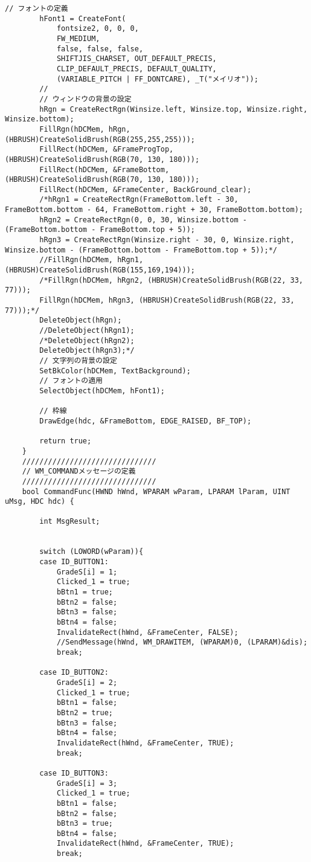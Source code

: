 \begin{lstlisting}[caption=main.cpp]
		// フォントの定義
		hFont1 = CreateFont(
			fontsize2, 0, 0, 0,
			FW_MEDIUM,
			false, false, false,
			SHIFTJIS_CHARSET, OUT_DEFAULT_PRECIS,
			CLIP_DEFAULT_PRECIS, DEFAULT_QUALITY,
			(VARIABLE_PITCH | FF_DONTCARE), _T("メイリオ"));
		//
		// ウィンドウの背景の設定
		hRgn = CreateRectRgn(Winsize.left, Winsize.top, Winsize.right, Winsize.bottom);
		FillRgn(hDCMem, hRgn, (HBRUSH)CreateSolidBrush(RGB(255,255,255)));
		FillRect(hDCMem, &FrameProgTop, (HBRUSH)CreateSolidBrush(RGB(70, 130, 180)));
		FillRect(hDCMem, &FrameBottom, (HBRUSH)CreateSolidBrush(RGB(70, 130, 180)));
		FillRect(hDCMem, &FrameCenter, BackGround_clear);
		/*hRgn1 = CreateRectRgn(FrameBottom.left - 30, FrameBottom.bottom - 64, FrameBottom.right + 30, FrameBottom.bottom);
		hRgn2 = CreateRectRgn(0, 0, 30, Winsize.bottom - (FrameBottom.bottom - FrameBottom.top + 5));
		hRgn3 = CreateRectRgn(Winsize.right - 30, 0, Winsize.right, Winsize.bottom - (FrameBottom.bottom - FrameBottom.top + 5));*/
		//FillRgn(hDCMem, hRgn1, (HBRUSH)CreateSolidBrush(RGB(155,169,194)));
		/*FillRgn(hDCMem, hRgn2, (HBRUSH)CreateSolidBrush(RGB(22, 33, 77)));
		FillRgn(hDCMem, hRgn3, (HBRUSH)CreateSolidBrush(RGB(22, 33, 77)));*/
		DeleteObject(hRgn);
		//DeleteObject(hRgn1);
		/*DeleteObject(hRgn2);
		DeleteObject(hRgn3);*/
		// 文字列の背景の設定
		SetBkColor(hDCMem, TextBackground);
		// フォントの適用
		SelectObject(hDCMem, hFont1);
		
		// 枠線
		DrawEdge(hdc, &FrameBottom, EDGE_RAISED, BF_TOP);
	
		return true;
	}
	///////////////////////////////
	// WM_COMMANDメッセージの定義
	///////////////////////////////
	bool CommandFunc(HWND hWnd, WPARAM wParam, LPARAM lParam, UINT uMsg, HDC hdc) {
	
		int MsgResult;
		
	
		switch (LOWORD(wParam)){
		case ID_BUTTON1:
			GradeS[i] = 1;
			Clicked_1 = true;
			bBtn1 = true;
			bBtn2 = false;
			bBtn3 = false;
			bBtn4 = false;
			InvalidateRect(hWnd, &FrameCenter, FALSE);
			//SendMessage(hWnd, WM_DRAWITEM, (WPARAM)0, (LPARAM)&dis);
			break;
	
		case ID_BUTTON2:
			GradeS[i] = 2;
			Clicked_1 = true;
			bBtn1 = false;
			bBtn2 = true;
			bBtn3 = false;
			bBtn4 = false;
			InvalidateRect(hWnd, &FrameCenter, TRUE);
			break;
	
		case ID_BUTTON3:
			GradeS[i] = 3;
			Clicked_1 = true;
			bBtn1 = false;
			bBtn2 = false;
			bBtn3 = true;
			bBtn4 = false;
			InvalidateRect(hWnd, &FrameCenter, TRUE);
			break;
	

\end{lstlisting}
